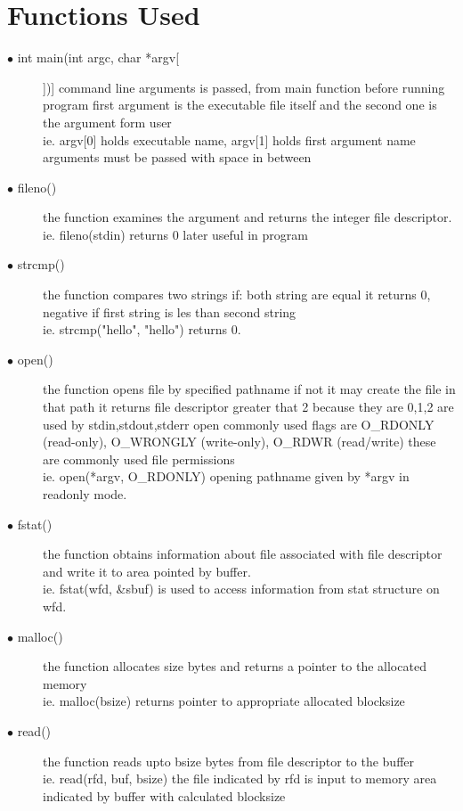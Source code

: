 \documentclass[12pt,a4paper,oneside]{report}
\begin{document}
\section*{Functions Used}
\begin{description}
    \item[$\bullet$ int main(int argc, char *argv[]])]
command line arguments is passed, from main function before running program
first argument is the executable file itself and the second one is the argument form user\\
ie. argv[0] holds executable name, argv[1] holds first argument name arguments must be passed with space in between

\item[$\bullet$ fileno()]
the function examines the argument and returns the integer file descriptor.\\
ie. fileno(stdin) returns 0 later useful in program

\item[$\bullet$ strcmp()]
the function compares two strings if: both string are equal it returns 0, negative if first string is les than second string\\
ie. strcmp("hello", "hello") returns 0.

\item[$\bullet$ open()]
the function opens file by specified pathname if not it may create the file in that path
it returns file descriptor greater that 2 because they are 0,1,2 are used by stdin,stdout,stderr
open commonly used flags are O\_RDONLY (read-only), O\_WRONGLY (write-only), O\_RDWR (read/write) these are commonly used file permissions\\
ie. open(*argv, O\_RDONLY) opening pathname given by *argv in readonly mode.

\item[$\bullet$ fstat()]
the function obtains information about file associated with file descriptor and write it to area pointed by buffer.\\
ie. fstat(wfd, \&sbuf) is used to access information from stat structure on wfd.

\item[$\bullet$ malloc()]
the function allocates size bytes and returns a pointer to the allocated memory\\
ie. malloc(bsize) returns pointer to appropriate allocated blocksize

\item[$\bullet$ read()]
the function reads upto bsize bytes from file descriptor to the buffer\\
ie. read(rfd, buf, bsize) the file indicated by rfd is input to memory area indicated by buffer with calculated blocksize


\end{description}
\end{document}
